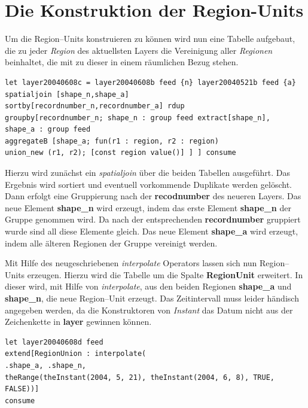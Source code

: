 \section{Die Konstruktion der Region-Units}
Um die Region--Units konstruieren zu können wird nun eine Tabelle aufgebaut, die zu jeder \textit{Region} des aktuellsten Layers die Vereinigung aller \textit{Regionen} beinhaltet, die mit zu dieser in einem räumlichen Bezug stehen. 

\begin{verbatim}
let layer20040608c = layer20040608b feed {n} layer20040521b feed {a} 
spatialjoin [shape_n,shape_a] 
sortby[recordnumber_n,recordnumber_a] rdup 
groupby[recordnumber_n; shape_n : group feed extract[shape_n], 
shape_a : group feed 
aggregateB [shape_a; fun(r1 : region, r2 : region) 
union_new (r1, r2); [const region value()] ] ] consume
\end{verbatim}

Hierzu wird zunächst ein \textit{spatialjoin} über die beiden Tabellen ausgeführt. Das Ergebnis wird sortiert und eventuell vorkommende Duplikate werden gelöscht. Dann erfolgt eine Gruppierung nach der \textbf{recodnumber} des neueren Layers. Das neue Element \textbf{shape\_n} wird erzeugt, indem das erste Element \textbf{shape\_n} der Gruppe genommen wird. Da nach der entsprechenden \textbf{recordnumber} gruppiert wurde sind all diese Elemente gleich. Das neue Element \textbf{shape\_a} wird erzeugt, indem alle älteren Regionen der Gruppe vereinigt werden.

Mit Hilfe des neugeschriebenen \textit{interpolate} Operators lassen sich nun Region--Units erzeugen. Hierzu wird die Tabelle um die Spalte \textbf{RegionUnit} erweitert. In dieser wird, mit Hilfe von \textit{interpolate}, aus den beiden Regionen \textbf{shape\_a} und \textbf{shape\_n}, die neue Region--Unit erzeugt. Das Zeitintervall muss leider händisch angegeben werden, da die Konstruktoren von \textit{Instant} das Datum nicht aus der Zeichenkette in \textbf{layer} gewinnen können.
\begin{verbatim}
let layer20040608d feed 
extend[RegionUnion : interpolate(
.shape_a, .shape_n,
theRange(theInstant(2004, 5, 21), theInstant(2004, 6, 8), TRUE, FALSE))] 
consume
\end{verbatim}

